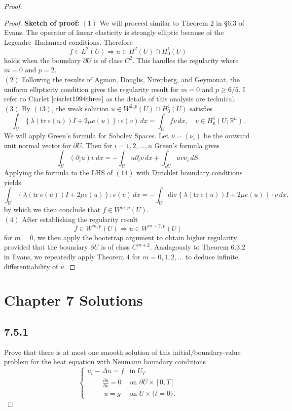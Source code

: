 \documentclass{article}
\begin{document}
\begin{flushleft}
\begin{proof}
\begin{proof}
\textbf{Sketch of proof:}
$(1)$ We will proceed similar to Theorem $2$ in §$6.3$ of Evans. The operator of linear elasticity is strongly elliptic because of the Legendre–Hadamard conditions. Therefore 
$$f\in L^2(U) \Longrightarrow u\in H^2(U)\cap H_0^1(U)$$
holds when the boundary $\partial U$ is of class $C^2$. This handles the regularity where $m=0$ and $p=2$. 
\bigskip
\\
$(2)$ Following the results of Agmon, Douglis, Nirenberg, and Geymonat, the uniform ellipticity condition gives the regularity result for $m=0$ and $p\ge 6/5$. I refer to Ciarlet $\cite{ciarlet1994three}$ as the details of this analysis are technical.
\bigskip
\\
$(3)$ By $(13)$, the weak solution $u\in W^{2,p}(U)\cap H_0^1(U)$ satisfies
\begin{equation}\int_U \left\{\lambda(\text{tr}~e(u))I+2\mu e(u)\right\}:e(v)\,dx=\int_U fv\,dx, \quad v\in H_0^1(U;\mathbb R^n).\end{equation}
We will apply Green's formula for Sobolev Spaces. Let $\nu=(\nu_i)$ be the outward unit normal vector for $\partial U$. Then for $i=1,2,\ldots,n$ Green's formula gives
$$\int_U (\partial_i u)v\,dx =-\int_U u \partial_i v\,dx +\int_{\partial U} uv \nu_i\,dS.$$
Applying the formula to the LHS of $(14)$ with Dirichlet boundary conditions yields
$$\int_U \left\{\lambda(\text{tr}~e(u))I+2\mu e(u)\right\}:e(v)\,dx=-\int_U\text{div}\left\{\lambda(\text{tr}~e(u))I+2\mu e(u)\right\}\cdot v\,dx,$$
by which we then conclude that $f\in W^{m,p}(U)$.
\bigskip
\\
$(4)$ After establishing the regularity result
$$f\in W^{m,p}(U) \Longrightarrow u\in W^{m+2,p}(U)$$
for $m=0$, we then apply the bootstrap argument to obtain higher regularity provided that the boundary $\partial U$ is of class $C^{m+2}$. Analagously to Theorem $6.3.2$ in Evans, we repeatedly apply Theorem $4$ for $m=0,1,2,\ldots$ to deduce infinite differentiability of $u$.


\end{proof}

\section{Chapter 7 Solutions}
\subsection{\textbf{7.5.1}} Prove that there is at most one smooth solution of this initial/boundary-value problem for the heat equation with Neumann boundary conditions
\[
  \begin{cases} 
      u_t-\Delta u=f & \text{in $U_T$} \\
      ~\qquad\frac{\partial u}{\partial \nu}=0 & \text{on $\partial U\times[0,T]$} \\
      ~~\qquad u = g & \text{on $U\times \{t=0\}$.}
   \end{cases}
\]


\end{proof}
\end{flushleft}
\end{document}
